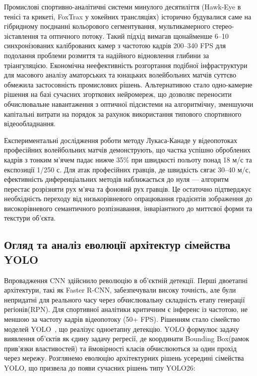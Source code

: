 Промислові спортивно-аналітичні системи минулого десятиліття (Hawk-Eye в тенісі та крикеті,
FoxTrax у хокейних трансляціях) історично будувалися саме на гібридному поєднанні
кольорового сегментування, мультикамерного стерео-зіставлення та оптичного потоку. Такий підхід
вимагав щонайменше 6--10 синхронізованих каліброваних камер з частотою кадрів 200--340 FPS
для подолання проблеми розмиття та надійного відновлення глибини за тріангуляцією.
Економічна неефективність розгортання подібної інфраструктури для масового аналізу аматорських
та юнацьких волейбольних матчів суттєво обмежила застосовність промислових рішень. Альтернативою
стало одно-камерне рішення на базі сучасних згорткових нейромереж, що дозволяє переносити
обчислювальне навантаження з оптичної підсистеми на алгоритмічну, зменшуючи капітальні витрати
на порядок за рахунок використання типового спортивного відеообладнання.

Експериментальні дослідження роботи методу Лукаса-Канаде у відеопотоках професійних
волейбольних матчів демонструють, що частка успішно
оброблених кадрів з тонким м'ячем падає нижче 35\% при швидкості польоту понад 18 м/с
та експозиції 1/250 с. Для атак професійних гравців, де швидкість сягає 30--40 м/с,
ефективність диференціальних методів наближається до нуля --- алгоритм перестає розрізняти
рух м'яча та фоновий рух гравців. Це остаточно підтверджує необхідність переходу від
низькорівневого опрацювання градієнтів зображення до високорівневого семантичного
розпізнавання, інваріантного до миттєвої форми та текстури об'єкта.

\subsection{Огляд та аналіз еволюції архітектур сімейства YOLO}
Впровадження \gls{CNN} здійснило
революцію в об'єктній детекції. Перші двоетапні архітектури, такі як \gls{Faster R-CNN}, забезпечували високу точність, але були
непридатні для реального часу через обчислювальну складність етапу
генерації регіонів(\gls{RPN}). Для спортивної аналітики
критичним є інференс із частотою, не меншою за частоту кадрів відеопотоку
(50+ \gls{FPS}).
Рішенням стало сімейство моделей \gls{YOLO}~\cite{redmon_yolo}, що
реалізує одноетапну детекцію. \gls{YOLO} формулює задачу виявлення
об'єктів як єдину задачу регресії, де координати Bounding Box(рамок прив'язки властивостей) та ймовірності
класів обчислюються за один прохід через мережу. Розглянемо
еволюцію архітектурних рішень усередині сімейства \gls{YOLO}, що призвела до
появи сучасних рішень типу YOLO26:

